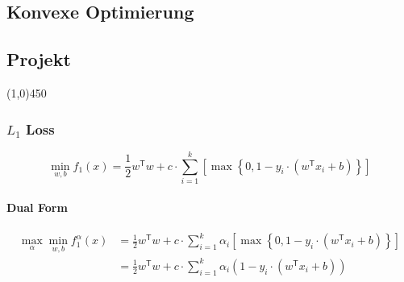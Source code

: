 \documentclass[15pt,landscape]{article}
\newcommand{\hr}{\begin{center} \line(1,0){450} \end{center}}
\newcommand{\tr}{^\mathsf{T}}
\begin{document}
\begin{center}
	\section*{Konvexe Optimierung}
	\subsection*{Projekt}
\end{center}
\hr
\subsubsection*{$L_1$ Loss}
\newcommand{\oneLossReg}{\max \left\{ 0,1-y_i \cdot \left( w\tr x_i + b \right) \right\}}
\begin{equation}
\min\limits_{w,b} f_1(x) = \frac{1}{2} w\tr w +c \cdot \sum\limits_{i=1}^k \left[ \oneLossReg \right]
\end{equation}
\paragraph{Dual Form}

\begin{align}
\max\limits_{\alpha} \min\limits_{w,b} f_1^\alpha(x) &= \frac{1}{2} w\tr w +c \cdot \sum\limits_{i=1}^k \alpha_i \left[ \oneLossReg \right] \nonumber \\
&= \frac{1}{2} w\tr w +c \cdot \sum\limits_{i=1}^k \alpha_i \left(  1-y_i \cdot \left( w\tr x_i + b \right) \right)\\
\end{align}
\end{document}
